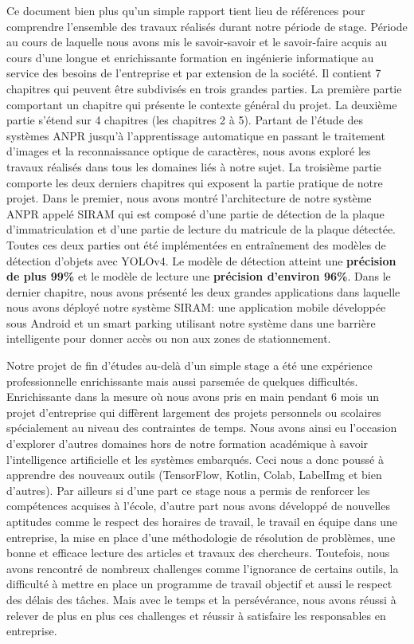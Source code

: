 Ce document bien plus qu’un simple rapport tient lieu de références pour comprendre l’ensemble des travaux réalisés durant notre période de stage. Période au cours de laquelle nous avons mis le  savoir-savoir et  le savoir-faire acquis au cours d’une longue et enrichissante formation en ingénierie informatique au service des besoins de l’entreprise et par extension de la société. Il contient 7 chapitres qui peuvent être subdivisés en trois grandes parties. La première partie comportant un chapitre qui présente le contexte général du projet. La deuxième partie s'étend sur 4 chapitres (les chapitres 2 à 5). Partant de l’étude des systèmes ANPR jusqu’à l’apprentissage automatique en passant le traitement d’images et la reconnaissance optique de caractères, nous avons exploré les travaux réalisés  dans tous les domaines liés à notre sujet. La troisième partie comporte les deux derniers chapitres qui exposent la partie pratique de notre projet. Dans le premier, nous avons montré l’architecture de notre système ANPR appelé SIRAM qui est composé d'une partie de détection de la plaque d’immatriculation et d’une partie de lecture du matricule de la plaque détectée. Toutes ces deux parties ont été implémentées en entraînement des modèles de détection d’objets avec YOLOv4. Le modèle de détection atteint une \textbf{précision de plus 99\%} et le modèle de lecture une \textbf{précision d'environ 96\%}. Dans le dernier chapitre, nous avons présenté les deux grandes applications dans laquelle nous avons déployé notre système SIRAM: une application mobile développée sous Android et un smart parking utilisant notre système dans une barrière intelligente pour donner accès ou non aux zones de stationnement.


Notre projet de fin d’études au-delà d’un simple stage a été une expérience professionnelle enrichissante mais aussi parsemée de quelques difficultés. Enrichissante dans la mesure où nous avons pris en main pendant 6 mois un projet d’entreprise qui diffèrent largement des projets personnels ou scolaires spécialement au niveau des contraintes de temps. Nous avons ainsi eu l’occasion d'explorer d'autres domaines hors de notre formation académique à savoir l’intelligence artificielle et les systèmes embarqués. Ceci nous a donc poussé à apprendre des nouveaux outils (TensorFlow, Kotlin, Colab, LabelImg et bien d’autres). Par ailleurs si d’une part ce stage nous a permis de renforcer les compétences acquises à l’école, d’autre part nous avons développé de nouvelles aptitudes comme le respect des horaires de travail, le travail en équipe dans une entreprise, la mise en place d’une méthodologie de résolution de problèmes, une bonne et efficace lecture des articles et travaux des chercheurs. Toutefois,  nous avons rencontré de nombreux challenges comme l’ignorance de certains outils, la difficulté à mettre en place un programme de travail objectif et aussi le respect des délais des tâches. Mais avec le temps et la persévérance, nous avons réussi à relever de plus en plus ces challenges et réussir à satisfaire les responsables en entreprise. 


